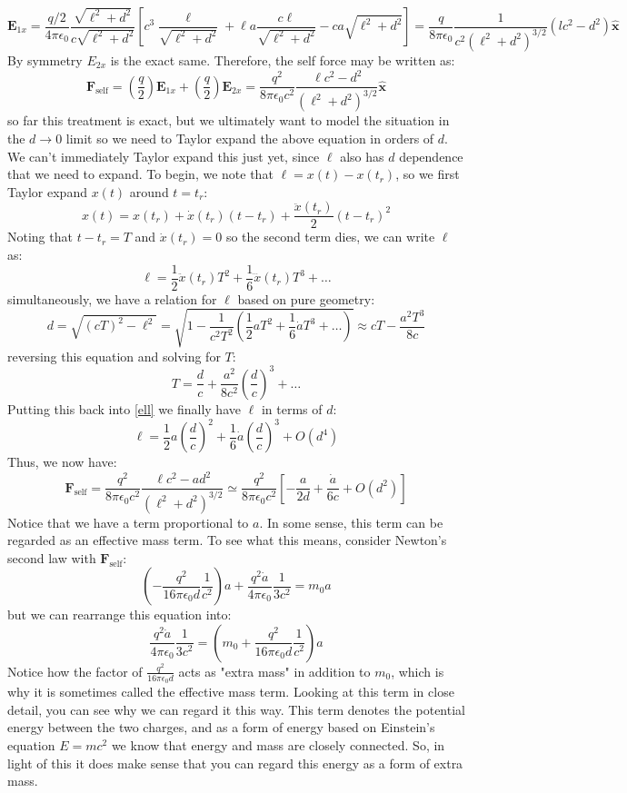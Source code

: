 \[
	\mathbf{E}_{1x} = \frac{q / 2}{4\pi \epsilon_0} \frac{\sqrt{\ell^2 + d^2}}{c \sqrt{\ell^2 + d^2}} \left[ c^3
	\frac{\ell}{\sqrt{\ell^2 + d^2}} + \ell a \frac{c\ell}{\sqrt{\ell^2 + d^2}} - ca\sqrt{\ell^2 + d^2} \right] =
	\frac{q}{8\pi \epsilon_0} \frac{1}{c^2(\ell^2 + d^2)^{3 /2}} \left( lc^2 - d^2 \right)\mathbf{\hat{x}}
\]
By symmetry \( E_{2x} \) is the exact same. Therefore, the self force may be written as:
\[
	\mathbf{F}_\text{self} = \left( \frac{q}{2} \right) \mathbf{E}_{1x} + \left( \frac{q}{2} \right)
	\mathbf{E}_{2x} = \frac{q^2}{8 \pi \epsilon_0 c^2} \frac{\ell c^2 - d^2}{(\ell^2 + d^2) ^{3 /
	2}}\mathbf{\hat{x}}
\]
so far this treatment is exact, but we ultimately want to model the situation in the \( d \to 0 \) limit
so we need to Taylor expand the above equation in orders of \( d \). We can't immediately Taylor expand this
just yet, since \( \ell \) also has \( d \) dependence that we need to expand. To begin, we note that \( \ell
= x(t) - x(t_r) \), so we first Taylor expand \( x(t) \) around \( t = t_r \):
\[
	x(t) = x(t_r) + \dot x(t_r) (t - t_r) + \frac{\ddot x(t_r)}{2}(t - t_r)^2
\]
Noting that \( t - t_r = T \) and \( \dot x(t_r) = 0 \) so the second term dies, we can write \( \ell \) as:
\begin{equation}
	\label{ell}
	\ell = \frac{1}{2} \ddot x(t_r) T^2 + \frac{1}{6} \dddot x(t_r) T^3 + \dots 
\end{equation}
simultaneously, we have a relation for \( \ell \) based on pure geometry:
\[
	d = \sqrt{(cT)^2 - \ell^2} = \sqrt{1 - \frac{1}{c^2 T^2} \left( \frac{1}{2} aT^2 + \frac{1}{6} \dot a T^3 +
	\dots \right)} \approx cT - \frac{a^2 T^3}{8c}
\]
reversing this equation and solving for \( T \):
\[
	T = \frac{d}{c} + \frac{a^2}{8c^2}\left( \frac{d}{c} \right)^3 + \dots
\]
Putting this back into \cref{ell} we finally have \( \ell \) in terms of \( d \):
\[
	\ell = \frac{1}{2}a \left( \frac{d}{c} \right)^2 + \frac{1}{6}\dot a \left( \frac{d}{c} \right)^3 +
	O(d^{4}) 
\]
Thus, we now have:
\[
	\mathbf{F}_\text{self} = \frac{q^2}{8 \pi \epsilon_0 c^2} \frac{\ell c^2 - ad^2}{(\ell^2 + d^2)^{3 / 2}}
	\simeq \frac{q^2}{8 \pi \epsilon_0 c^2} \left[ -\frac{a}{2d} + \frac{\dot a}{6c} + O(d^2) \right]
\]
Notice that we have a term proportional to \( a \). In some sense, this term can be regarded as an effective
mass term. To see what this means, consider Newton's second law with \( \mathbf{F}_\text{self} \):
\[
	\left( -\frac{q^2}{16 \pi \epsilon_0d}\frac{1}{c^2} \right) a + \frac{q^2 \dot a}{4 \pi \epsilon_0}
	\frac{1}{3c^2} = m_0a
\]
but we can rearrange this equation into:
\[
	\frac{q^2 \dot a}{4 \pi \epsilon_0} \frac{1}{3c^2} = \left( m_0 + \frac{q^2}{16 \pi \epsilon_0 d}
	\frac{1}{c^2} \right)a
\]
Notice how the factor of \( \frac{q^2}{16 \pi \epsilon_0 d} \) acts as "extra mass" in addition to \( m_0 \),
which is why it is sometimes called the effective mass term. Looking at this term in close detail, you can
see why we can regard it this way. This term denotes the potential energy between the two charges, and as a
form of energy based on Einstein's equation \( E = mc^2 \) we know that energy and mass are closely
connected. So, in light of this it does make sense that you can regard this energy as a form of extra mass. 
